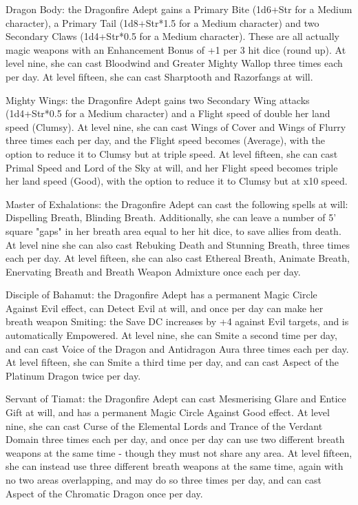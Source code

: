 \begin{itemize*}
\item Dragon Body: the Dragonfire Adept gains a Primary Bite (1d6+Str for a Medium character), a Primary Tail (1d8+Str*1.5 for a Medium character) and two Secondary Claws (1d4+Str*0.5 for a Medium character). These are all actually magic weapons with an Enhancement Bonus of +1 per 3 hit dice (round up). At level nine, she can cast Bloodwind and Greater Mighty Wallop three times each per day. At level fifteen, she can cast Sharptooth and Razorfangs at will. 
\item Mighty Wings: the Dragonfire Adept gains two Secondary Wing attacks (1d4+Str*0.5 for a Medium character) and a Flight speed of double her land speed (Clumsy). At level nine, she can cast Wings of Cover and Wings of Flurry three times each per day, and the Flight speed becomes (Average), with the option to reduce it to Clumsy but at triple speed. At level fifteen, she can cast Primal Speed and Lord of the Sky at will, and her Flight speed becomes triple her land speed (Good), with the option to reduce it to Clumsy but at x10 speed. 
\item Master of Exhalations: the Dragonfire Adept can cast the following spells at will: Dispelling Breath, Blinding Breath. Additionally, she can leave a number of 5' square "gaps" in her breath area equal to her hit dice, to save allies from death. At level nine she can also cast Rebuking Death and Stunning Breath, three times each per day. At level fifteen, she can also cast Ethereal Breath, Animate Breath, Enervating Breath and Breath Weapon Admixture once each per day. 
\item Disciple of Bahamut: the Dragonfire Adept has a permanent Magic Circle Against Evil effect, can Detect Evil at will, and once per day can make her breath weapon Smiting: the Save DC increases by +4 against Evil targets, and is automatically Empowered. At level nine, she can Smite a second time per day, and can cast Voice of the Dragon and Antidragon Aura three times each per day. At level fifteen, she can Smite a third time per day, and can cast Aspect of the Platinum Dragon twice per day. 
\item Servant of Tiamat: the Dragonfire Adept can cast Mesmerising Glare and Entice Gift at will, and has a permanent Magic Circle Against Good effect. At level nine, she can cast Curse of the Elemental Lords and Trance of the Verdant Domain three times each per day, and once per day can use two different breath weapons at the same time - though they must not share any area. At level fifteen, she can instead use three different breath weapons at the same time, again with no two areas overlapping, and may do so three times per day, and can cast Aspect of the Chromatic Dragon once per day. 

\end{itemize*}

